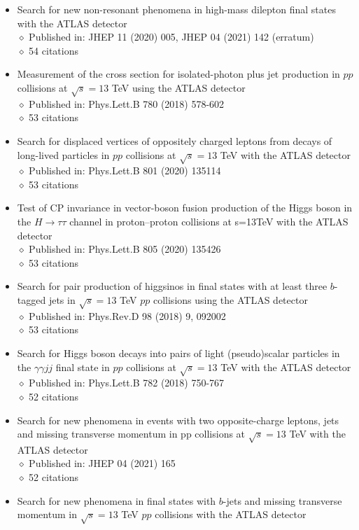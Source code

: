 \documentclass[margin, 10pt]{res} %
\begin{document}
\begin{resume}
\begin{itemize}
\item Search for new non-resonant phenomena in high-mass dilepton final states with the ATLAS detector\\
$\diamond$ Published in: JHEP 11 (2020) 005, JHEP 04 (2021) 142 (erratum)\\
$\diamond$ 54 citations
\item Measurement of the cross section for isolated-photon plus jet production in $pp$ collisions at $\sqrt{s} = 13$ TeV using the ATLAS detector\\
$\diamond$ Published in: Phys.Lett.B 780 (2018) 578-602\\
$\diamond$ 53 citations
\item Search for displaced vertices of oppositely charged leptons from decays of long-lived particles in $pp$ collisions at $\sqrt{s} = 13$ TeV with the ATLAS detector\\
$\diamond$ Published in: Phys.Lett.B 801 (2020) 135114\\
$\diamond$ 53 citations
\item Test of CP invariance in vector-boson fusion production of the Higgs boson in the $H \rightarrow \tau\tau$ channel in proton–proton collisions at s=13TeV with the ATLAS detector\\
$\diamond$ Published in: Phys.Lett.B 805 (2020) 135426\\
$\diamond$ 53 citations
\item Search for pair production of higgsinos in final states with at least three $b$-tagged jets in $\sqrt{s} = 13$ TeV $pp$ collisions using the ATLAS detector\\
$\diamond$ Published in: Phys.Rev.D 98 (2018) 9, 092002\\
$\diamond$ 53 citations
\item Search for Higgs boson decays into pairs of light (pseudo)scalar particles in the $\gamma\gamma jj$ final state in $pp$ collisions at $\sqrt{s} = 13$ TeV with the ATLAS detector\\
$\diamond$ Published in: Phys.Lett.B 782 (2018) 750-767\\
$\diamond$ 52 citations
\item Search for new phenomena in events with two opposite-charge leptons, jets and missing transverse momentum in pp collisions at $\sqrt{s} = 13$ TeV with the ATLAS detector\\
$\diamond$ Published in: JHEP 04 (2021) 165\\
$\diamond$ 52 citations
\item Search for new phenomena in final states with $b$-jets and missing transverse momentum in $\sqrt{s} = 13$ TeV $pp$ collisions with the ATLAS detector\\

\end{itemize}
\end{resume}
\end{document}
